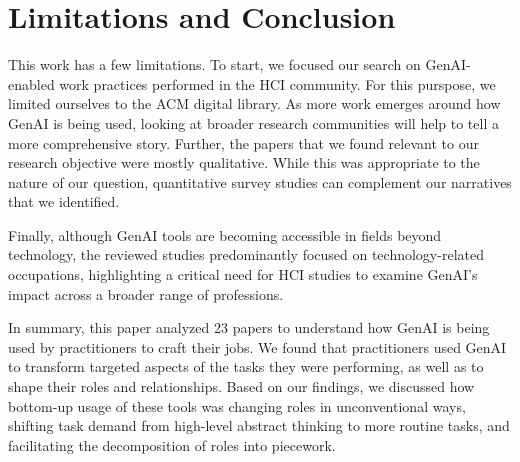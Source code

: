 \section{Limitations and Conclusion}
This work has a few limitations. To start, we focused our search on GenAI-enabled work practices performed in the HCI community. For this purspose, we limited ourselves to the ACM digital library. As more work emerges around how GenAI is being used, looking at broader research communities will help to tell a more comprehensive story. Further, the papers that we found relevant to our research objective were mostly qualitative. While this was appropriate to the nature of our question, quantitative survey studies can complement our narratives that we identified.

Finally, although GenAI tools are becoming accessible in fields beyond technology, the reviewed studies predominantly focused on technology-related occupations, highlighting a critical need for HCI studies to examine GenAI's impact across a broader range of professions.

In summary, this paper analyzed 23 papers to understand how GenAI is being used by practitioners to craft their jobs. We found that practitioners used GenAI to transform targeted aspects of the tasks they were performing, as well as to shape their roles and relationships. Based on our findings, we discussed how bottom-up usage of these tools was changing roles in unconventional ways, shifting task demand from high-level abstract thinking to more routine tasks, and facilitating the decomposition of roles into piecework. 

